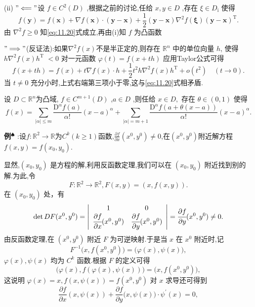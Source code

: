 (ii) $"\Longleftarrow"$设 $f\in C^{2}(D)$ ,根据之前的讨论,任给 $x,y\in D$ ,存在 $\xi\in D_{\mathrm{i}}$ 使得  
$$
f(\boldsymbol{y})=f(\boldsymbol{x})+\nabla f(\boldsymbol{x})\cdot(\boldsymbol{y}-\boldsymbol{x})+\frac{1}{2}(\boldsymbol{y}-\boldsymbol{x})\nabla^{2}f(\boldsymbol{\xi})(\boldsymbol{y}-\boldsymbol{x})^{\mathrm{T}}.
$$
由 $\nabla^{2}f\geqslant0$ 知\eqref{eq:11.20}式成立,再由(i)知 $f$ 为凸函数\par  
$"\Longrightarrow"$(反证法):如果$\nabla^{2}f(x)$不是半正定的,则存在 $\mathbb{R}^{n}$ 中的单位向量 $h$, 使得 $h\nabla^{2}f(x)h^{\mathrm{T}}$ $<0$ 对一元函数 $\varphi(t)=f(x+t h)$ 应用Taylor公式可得  
$$
f(x+t h)=f(x)+t\nabla f(x)\cdot h+{\frac{1}{2}}t^{2}h\nabla^{2}f(x)h^{\mathrm{T}}+o(t^{2})\quad(t\to0).
$$
当 $t\neq0$ 充分小时,上式右端第三项小于零,这与\eqref{eq:11.20}式相矛盾.\par
\begin{tcolorbox}[colback=KuangNei,colframe=BianKuang,title=\textbf{Taylor公式},sharpish corners]
设 $D\subset\mathbb{R}^{n}$为凸域, $f\in C^{m+1}(D)$ ,$a\in D$ ,则任给 $x\in D,$ 存在 $\theta\in(0,1)$ 使得  
$$
f(x)=\sum_{|\alpha|\leqslant m}{\frac{\mathrm{D}^{\alpha}f(a)}{\alpha!}}(x-a)^{\alpha}+\sum_{|\alpha|=m+1}{\frac{\mathrm{D}^{\alpha}f(a+\theta(x-a))}{\alpha!}}(x-a)^{\alpha}.
$$
\end{tcolorbox}
\textbf{例}$^\spadesuit$ :设$f:\mathbb{R}^2\to\mathbb{R}$为$ C^k(k\geqslant 1)$函数,$\frac{\partial f}{\partial x}(x^0,y^0)\neq 0$,在$(x^0,y^0)$附近解方程 $f(x,y)=f(x_{0},y_{0})$.\par
显然,$(x_{0},y_{0})$ 是方程的解,利用反函数定理,我们可以在 $(x_{0},y_{0})$ 附近找到别的解.为此,令  
$$
F:\mathbb{R}^{2}\to\mathbb{R}^{2},F(x,y)=(x,f(x,y)).
$$
在 $(x_{0},y_{0})$ 处，有  
$$
\operatorname*{det}D F(x^{0},y^{0})=\left|{\begin{array}{c c}{1}&{0}\\ {{\cfrac{\partial f}{\partial x}}(x^{0},y^{0})}&{{\cfrac{\partial f}{\partial y}}(x^{0},y^{0})}\end{array}}\right|={\cfrac{\partial f}{\partial y}}(x^{0},y^{0})\neq0.
$$
由反函数定理,在 $(x^{0},y^{0})$ 附近 $F$ 为可逆映射.于是当 $x$ 在 $x^{0}$ 附近时,记 
$$
F^{-1}\bigl(x,f(x^{0},y^{0})\bigr)=\bigl(\varphi(x),\psi(x)\bigr),
$$
$\varphi(x),\psi(x)$ 均为 $C^{k}$ 函数.根据 $F$ 的定义可得  
$$
\bigl(\varphi(x),f(\varphi(x),\psi(x))\bigr)=\bigl(x,f(x^{0},y^{0})\bigr),
$$
这说明 $\varphi(x)=x,f(x,\psi(x))=f(x^{0},y^{0})$ 对 $x$ 求导还可得到  
$$
{\frac{\partial f}{\partial x}}(x,\psi(x))+{\frac{\partial f}{\partial y}}\big(x,\psi(x)\big)\cdot\psi^{\prime}(x)=0,
$$
